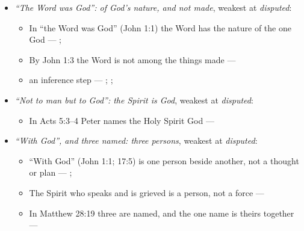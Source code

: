 \documentclass[11pt,paper=\testimonypaper,DIV=13,parskip=false]{scrartcl}
\begin{document}
\begin{itemize}
\item \emph{“The Word was God”: of God’s nature, and not made}, weakest at \emph{disputed}:
\begin{itemize}
\item In “the Word was God” (John 1:1) the Word has the nature of the one God --- \cite{harner-qualitative-anarthrous-1973}; \cite[3, The Triune God]{kibbey-living-systematic-theology-2026}
\item By John 1:3 the Word is not among the things made --- \cite[Tractates on John I.11]{schaff-nicene-post-nicene-fathers-1-7}
\item an inference step --- \cite[3, The Triune God]{kibbey-living-systematic-theology-2026}; \cite[ch. 4, Conclusion]{bernard-oneness-of-god-1983}; \cite[17--19]{buzzard-caveat-lector-2001}
\end{itemize}
\item \emph{“Not to man but to God”: the Spirit is God}, weakest at \emph{disputed}:
\begin{itemize}
\item In Acts 5:3–4 Peter names the Holy Spirit God --- \cite[198]{calvin-commentary-acts-1844}
\end{itemize}
\item \emph{“With God”, and three named: three persons}, weakest at \emph{disputed}:
\begin{itemize}
\item “With God” (John 1:1; 17:5) is one person beside another, not a thought or plan --- \cite[3, The Triune God]{kibbey-living-systematic-theology-2026}; \cite[27]{watchtower-should-you-believe-trinity-1989}
\item The Spirit who speaks and is grieved is a person, not a force --- \cite[3, The Triune God]{kibbey-living-systematic-theology-2026}
\item In Matthew 28:19 three are named, and the one name is theirs together --- \cite[3, The Triune God]{kibbey-living-systematic-theology-2026}

\end{itemize}
\end{itemize}
\end{document}
